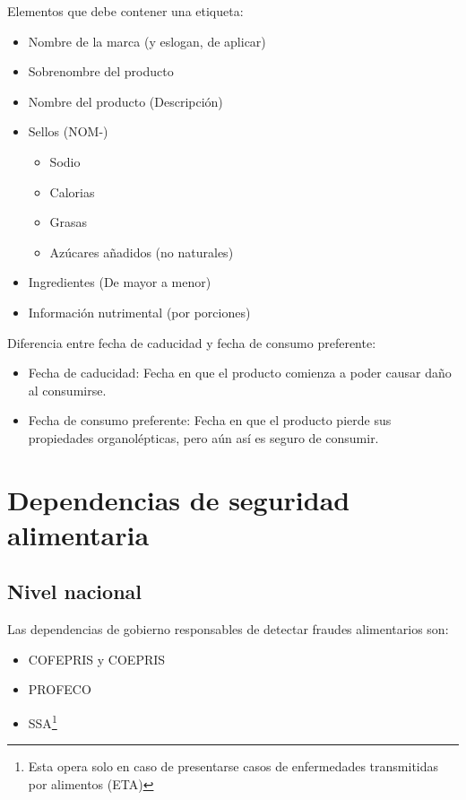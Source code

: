 Elementos que debe contener una etiqueta:

\begin{itemize}
    \item Nombre de la marca (y eslogan, de aplicar)
    \item Sobrenombre del producto
    \item Nombre del producto (Descripción)
    \item Sellos (NOM-)
        \begin{itemize}
	        \item Sodio
	        \item Calorias
	        \item Grasas
	        \item Azúcares añadidos (no naturales)
        \end{itemize}
    
    \item Ingredientes (De mayor a menor)
    \item Información nutrimental (por porciones)
\end{itemize}


Diferencia entre fecha de caducidad y fecha de consumo preferente:

\begin{itemize}
    \item Fecha de caducidad: Fecha en que el producto comienza a poder causar daño al consumirse.
    \item Fecha de consumo preferente: Fecha en que el producto pierde sus propiedades organolépticas, pero aún así es seguro de consumir.
\end{itemize}

\section{Dependencias de seguridad alimentaria}

\subsection{Nivel nacional}

Las dependencias de gobierno responsables de detectar fraudes alimentarios son:

\begin{itemize}
    \item COFEPRIS y COEPRIS
    \item PROFECO
    \item SSA\footnote{Esta opera solo en caso de presentarse casos de enfermedades transmitidas por alimentos (ETA)}
\end{itemize}

